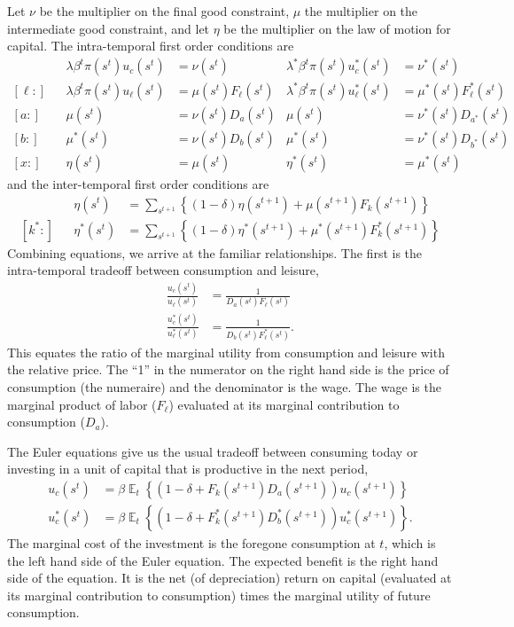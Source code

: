 \documentclass[11pt,pdftex,twoside,letterpaper]{exam}
\DeclareMathOperator{\EX}{\mathbb{E}}%
\begin{document}
Let $\nu$ be the multiplier on the final good constraint, $\mu$ the multiplier on the intermediate good constraint, and let $\eta$ be the multiplier on the law of motion for capital. The intra-temporal first order conditions are
\begin{align}
  [c:]&&\lambda \beta^t \pi(s^t) u_c(s^t) &= \nu(s^t) & \lambda^* \beta^t \pi(s^t) u_c^*(s^t) &= \nu^*(s^t)\\
  [\ell:]&&\lambda \beta^t \pi(s^t) u_\ell(s^t) &= \mu(s^t)F_\ell(s^t) & \lambda^* \beta^t \pi(s^t) u_\ell^*(s^t) &= \mu^*(s^t)F^*_\ell(s^t)\\
  [a:]&&\mu(s^t) &= \nu(s^t)D_{a}(s^t) & \mu(s^t) &= \nu^*(s^t)D_{a^*}(s^t)\\
  [b:]&&\mu^*(s^t) &= \nu(s^t)D_{b}(s^t) & \mu^*(s^t) &= \nu^*(s^t)D_{b^*}(s^t)\\
  [x:]&&\eta(s^t) &= \mu(s^t) & \eta^*(s^t) &= \mu^*(s^t)
\end{align}
and the inter-temporal first order conditions are
\begin{align}
  [k:]&&\eta(s^t) &= \sum_{s^{t+1}}\left\{ (1-\delta)\eta(s^{t+1})+\mu(s^{t+1})F_k(s^{t+1}) \right\}\\
  [k^*:]&&\eta^*(s^t) &= \sum_{s^{t+1}}\left\{ (1-\delta)\eta^*(s^{t+1})+\mu^*(s^{t+1})F_k^*(s^{t+1}) \right\}
\end{align}
Combining equations, we arrive at the familiar relationships. The first is the intra-temporal tradeoff between consumption and leisure,
\begin{align}
  \frac{u_c(s^t)}{u_\ell(s^t)} &= \frac{1}{D_a(s^t)F_\ell(s^t)}\\
  \frac{u_c^*(s^t)}{u_\ell^*(s^t)} &= \frac{1}{D_b(s^t)F_\ell^*(s^t)}.
\end{align}
This equates the ratio of the marginal utility from consumption and leisure with the relative price. The ``1'' in the numerator on the right hand side is the price of consumption (the numeraire) and the denominator is the wage. The wage is the marginal product of labor ($F_\ell$) evaluated at its marginal contribution to consumption ($D_a$).

The Euler equations give us the usual tradeoff between consuming today or investing in a unit of capital that is productive in the next period,
\begin{align}
  u_c(s^t) & =\beta \EX_t\left\{ \left(1-\delta+F_k(s^{t+1})D_a(s^{t+1}) \right)u_c(s^{t+1})   \right\}\\
  u_c^*(s^t) & =\beta \EX_t\left\{ \left(1-\delta+F_k^*(s^{t+1})D_b^*(s^{t+1}) \right)u_c^*(s^{t+1})   \right\}.
\end{align}
The marginal cost of the investment is the foregone consumption at $t$, which is the left hand side of the Euler equation. The expected benefit is the right hand side of the equation. It is the net (of depreciation) return on capital (evaluated at its marginal contribution to consumption) times the marginal utility of future consumption.
\end{document}
